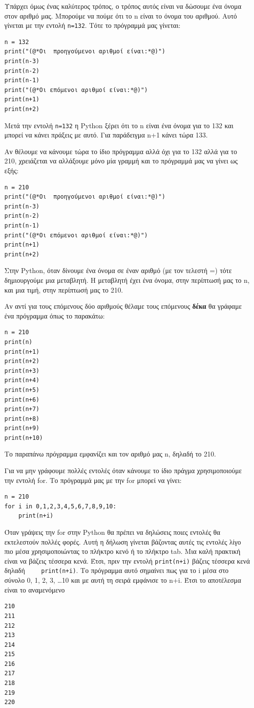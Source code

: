 \documentclass[b5paper,11pt,twoside,openleft]{memoir}
\begin{document}
Υπάρχει όμως ένας καλύτερος τρόπος, ο τρόπος αυτός είναι να δώσουμε ένα όνομα στον αριθμό μας. Μπορούμε να πούμε ότι το n είναι το όνομα του αριθμού. Αυτό γίνεται με την εντολή \lstinline{n=132}. Τότε το πρόγραμμά μας γίνεται:
\begin{lstlisting}
n = 132
print("(@*Οι  προηγούμενοι αριθμοί είναι:*@)")
print(n-3)
print(n-2)
print(n-1)
print("(@*Οι επόμενοι αριθμοί είναι:*@)")
print(n+1)
print(n+2)
\end{lstlisting}

Μετά την εντολή \lstinline{n=132} η Python ξέρει ότι το n είναι ένα όνομα για το 132 και μπορεί να κάνει πράξεις με αυτό. Για παράδειγμα n+1 κάνει τώρα 133.

Αν θέλουμε να κάνουμε τώρα το ίδιο πρόγραμμα αλλά όχι για το 132 αλλά για το 210, χρειάζεται να αλλάξουμε μόνο μία γραμμή και το πρόγραμμά μας να γίνει ως εξής:
\begin{lstlisting}
n = 210
print("(@*Οι  προηγούμενοι αριθμοί είναι:*@)")
print(n-3)
print(n-2)
print(n-1)
print("(@*Οι επόμενοι αριθμοί είναι:*@)")
print(n+1)
print(n+2)
\end{lstlisting}

Στην Python, όταν δίνουμε ένα όνομα σε έναν αριθμό (με τον τελεστή =) τότε δημιουργούμε μια μεταβλητή. Η μεταβλητή έχει ένα όνομα, στην περίπτωσή μας το n, και μια τιμή, στην περίπτωσή μας το 210.

Αν αντί για τους επόμενους δύο αριθμούς θέλαμε τους επόμενους \textbf{δέκα} θα γράφαμε ένα πρόγραμμα όπως το παρακάτω:
\begin{lstlisting}
n = 210
print(n)
print(n+1)
print(n+2)
print(n+3)
print(n+4)
print(n+5)
print(n+6)
print(n+7)
print(n+8)
print(n+9)
print(n+10)
\end{lstlisting}
Το παραπάνω πρόγραμμα εμφανίζει και τον αριθμό μας n, δηλαδή το 210.

Για να μην γράφουμε πολλές εντολές όταν κάνουμε το ίδιο πράγμα χρησιμοποιούμε την εντολή for.
Το πρόγραμμά μας με την for μπορεί να γίνει:
\begin{lstlisting}
n = 210
for i in 0,1,2,3,4,5,6,7,8,9,10:
    print(n+i)
\end{lstlisting}
Όταν γράψεις την for στην Python θα πρέπει να δηλώσεις ποιες εντολές θα εκτελεστούν πολλές φορές. Αυτή η δήλωση γίνεται βάζοντας αυτές τις εντολές λίγο πιο μέσα χρησιμοποιώντας το πλήκτρο κενό ή το πλήκτρο tab. Μια καλή πρακτική είναι να βάζεις τέσσερα κενά. Έτσι, πριν την εντολή \lstinline{print(n+i)} βάζεις τέσσερα κενά δηλαδή \lstinline[showspaces=true]{    print(n+i)}.
Το πρόγραμμα αυτό σημαίνει πως για το i μέσα στο σύνολο 0, 1, 2, 3, \ldots 10 και με αυτή τη σειρά εμφάνισε το n+i. Έτσι το αποτέλεσμα είναι το αναμενόμενο
\begin{lstlisting}
210
211
212
213
214
215
216
217
218
219
220
\end{lstlisting}
\end{document}
